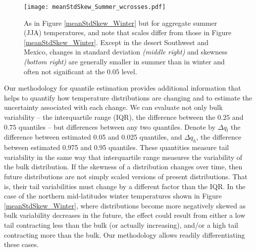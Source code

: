 \documentclass{ametsoc}
\newcommand\smallfigwidth{\columnwidth}
\begin{document}
\begin{figure}[ht]
\centerline{\texttt{[image: meanStdSkew\_Summer\_wcrosses.pdf]}}
\caption{\small{As in Figure \ref{meanStdSkew_Winter} but for aggregate summer (JJA) temperatures, and note that scales differ from those in Figure \ref{meanStdSkew_Winter}. Except in the desert Southwest and Mexico, changes in standard deviation \emph{(middle right)} and skewness \emph{(bottom right)} are generally smaller in summer than in winter and often not significant at the $0.05$ level.}}
\label{meanStdSkew_Summer}
\end{figure}




Our methodology for quantile estimation provides additional information that helps to
 quantify how temperature distributions are changing and to estimate the uncertainty associated with each change. 
We can evaluate not only bulk variability  -- the interquartile range (IQR), the difference between the $0.25$ and $0.75$ quantiles -- but differences between any two quantiles. 
{Denote by $\Delta q_{l}$ the difference between estimated 0.05 and 0.025 quantiles,  and $\Delta q_{h}$, the difference between estimated 0.975 and 0.95 quantiles.
These quantities measure tail variability in the same way that interquartile range measures the variability of the bulk distribution.
If the skewness of a distribution changes over time, then future distributions are not simply scaled versions of present distributions. That is, their tail variabilities must change by a different factor than the IQR.
  In the case of the northern mid-latitudes winter temperatures shown in Figure \ref{meanStdSkew_Winter}, where distributions become more negatively skewed as bulk variability decreases in the future, the effect could result from either a low tail contracting less than the bulk (or actually increasing), and/or a high tail contracting more than the bulk. Our methodology allows readily differentiating these cases.}
\end{document}

